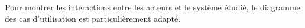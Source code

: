 \documentclass[11pt,oneside]{article}
\begin{document}
Pour montrer les interactions entre les acteurs et le système étudié, le diagramme des cas d’utilisation est particulièrement adapté. 

%
%
%
%

\vspace{.5cm}

\begin{center}
\end{center}



\end{document}
